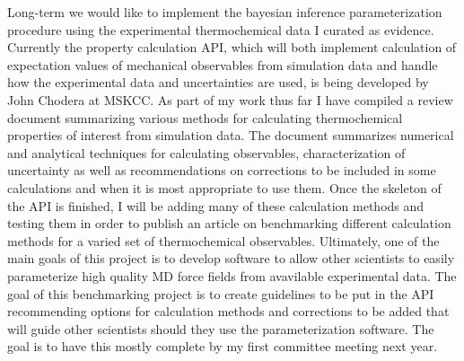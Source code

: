 \documentclass[rmp,nofootinbib,superscriptaddress,12pt,tightenlines,notitlepage]{revtex4-1}
\begin{document}
Long-term we would like to implement the bayesian inference parameterization procedure using the experimental thermochemical data I curated as evidence. 
Currently the property calculation API, which will both implement calculation of expectation values of mechanical observables from simulation data and 
handle how the experimental data and uncertainties are used, is being developed by John Chodera at MSKCC. As part of my work thus far I have compiled 
a review document summarizing various methods for calculating thermochemical properties of interest from simulation data. The document summarizes numerical
and analytical techniques for calculating observables, characterization of uncertainty as well as recommendations on corrections to be included in some
calculations and when it is most appropriate to use them. Once the skeleton of the API is finished, I will be adding many of these calculation methods and
testing them in order to publish an article on benchmarking different calculation methods for a varied set of thermochemical observables. Ultimately, one of
the main goals of this project is to develop software to allow other scientists to easily parameterize high quality MD force fields from avavilable experimental
 data. The goal of this benchmarking project is to create guidelines to be put in the API recommending options for calculation methods and corrections to be 
added that will guide other scientists should they use the parameterization software. The goal is to have this mostly complete by my first committee meeting 
next year.   



\end{document}
